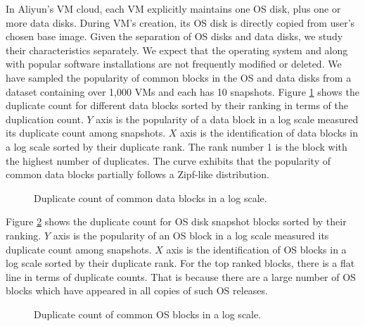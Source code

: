 In Aliyun's VM cloud, each VM explicitly maintains  one OS disk, plus  one or more data disks.
During VM's creation, its OS disk is directly copied from user's chosen base image.
Given the separation of OS disks and data disks, we study  their characteristics separately.
We expect that the operating system and along with popular software installations  are not frequently
modified or deleted. 
We have sampled  the  popularity of common blocks in the OS and data disks from a dataset
containing over 1,000 VMs and each has 10 snapshots.
Figure \ref{fig:zipf-data} shows the duplicate count  for different data blocks sorted by their ranking in 
terms of the duplication count. $Y$ axis is the popularity of a data block in a log scale 
measured its duplicate count among snapshots. $X$ axis is the identification of data blocks in a log scale
sorted by their duplicate rank.  The rank number  1  is the block with the highest number of duplicates.
The curve exhibits that the popularity of common data blocks partially follows a  Zipf-like distribution.


\begin{figure}[htbp]
\centering
\caption{Duplicate count  of common data blocks in a log scale.}
\label{fig:zipf-data}
\end{figure}
Figure \ref{fig:OSpopular} shows the duplicate count  for OS disk snapshot blocks sorted by their ranking.
$Y$ axis is the popularity of an OS block in a log scale 
measured its duplicate count among snapshots. $X$ axis is the identification of OS blocks in a log scale
sorted by their duplicate rank.  For the top ranked blocks, there is a flat line in terms of duplicate counts. That
is because there are a large number of OS blocks which have appeared in all copies of such OS releases.

\begin{figure}
\centering
\caption{ Duplicate count of  common OS blocks in a log scale.}
\label{fig:OSpopular}
\end{figure}

